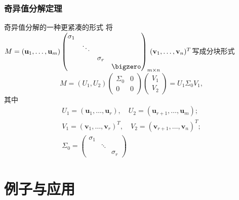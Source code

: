 
\begin{frame}
\frametitle{奇异值分解定理}

\begin{block}{奇异值分解的一种更紧凑的形式}
将$M = (\mathbf{u}_1,\ldots,\mathbf{u}_m) \begin{pmatrix}
\sigma_1 & & & \\ & \ddots & & \\ & & \sigma_r & \\ & & & \bigzero \end{pmatrix}_{m\times n}\!\!\!\!\!\!\!\!\!\!(\mathbf{v}_1,\ldots,\mathbf{v}_n)^T$写成分块形式
\[M = (U_1, U_2) \begin{pmatrix} \Sigma_0 & 0 \\ 0 & 0 \end{pmatrix} \begin{pmatrix} V_1 \\ V_2 \end{pmatrix} = U_1\Sigma_0V_1,\]
其中
\begin{gather*}
U_1 = (\mathbf{u}_1,\ldots,\mathbf{u}_r), \quad U_2 = (\mathbf{u}_{r+1},\ldots,\mathbf{u}_m); \\
V_1 = (\mathbf{v}_1,\ldots,\mathbf{v}_r)^T, \quad V_2 = (\mathbf{v}_{r+1},\ldots,\mathbf{v}_n)^T; \\
\Sigma_0 = \begin{pmatrix}
\sigma_1 & & \\ & \ddots & \\ & & \sigma_r \end{pmatrix}
\end{gather*}

\end{block}

\end{frame}


\section{例子与应用}


